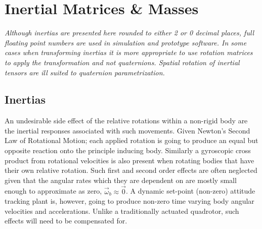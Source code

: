 \section{Inertial Matrices \& Masses}
\label{sec:proto.inertia}
\emph{\color{Gray}Although inertias are presented here rounded to either 2 or 0 decimal places, full floating point numbers are used in simulation and prototype software. In some cases when transforming inertias it is more appropriate to use rotation matrices to apply the transformation and not quaternions. Spatial rotation of inertial tensors are ill suited to quaternion parametrization.}
\subsection*{Inertias}
An undesirable side effect of the relative rotations within a non-rigid body are the inertial responses associated with such movements. Given Newton's Second Law of Rotational Motion; each applied rotation is going to produce an equal but opposite reaction onto the principle inducing body. Similarly a gyroscopic cross product from rotational velocities is also present when rotating bodies that have their own relative rotation. Such first and second order effects are often neglected given that the angular rates which they are dependent on are mostly small enough to approximate as zero, $\vec{\omega}_b\approx\vec{0}$. A dynamic set-point (non-zero) attitude tracking plant is, however, going to produce non-zero time varying body angular velocities and accelerations. Unlike a traditionally actuated quadrotor, such effects will need to be compensated for.
